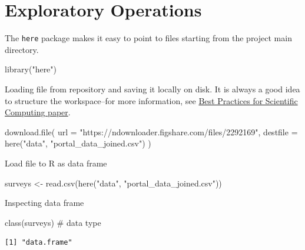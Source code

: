\documentclass[
  letterpaper,
  DIV=11,
  numbers=noendperiod]{scrreprt}
\newenvironment{Shaded}{\begin{snugshade}}{\end{snugshade}}
\newcommand{\AttributeTok}[1]{\textcolor[rgb]{0.40,0.45,0.13}{#1}}
\newcommand{\CommentTok}[1]{\textcolor[rgb]{0.37,0.37,0.37}{#1}}
\newcommand{\FunctionTok}[1]{\textcolor[rgb]{0.28,0.35,0.67}{#1}}
\newcommand{\NormalTok}[1]{\textcolor[rgb]{0.00,0.23,0.31}{#1}}
\newcommand{\OtherTok}[1]{\textcolor[rgb]{0.00,0.23,0.31}{#1}}
\newcommand{\StringTok}[1]{\textcolor[rgb]{0.13,0.47,0.30}{#1}}
\begin{document}
\section{Exploratory Operations}\label{exploratory-operations}

The \texttt{here} package makes it easy to point to files starting from
the project main directory.

\begin{Shaded}
\begin{Highlighting}[]
\FunctionTok{library}\NormalTok{(}\StringTok{"here"}\NormalTok{)}
\end{Highlighting}
\end{Shaded}

Loading file from repository and saving it locally on disk. It is always
a good idea to structure the workspace--for more information, see
\href{http://journals.plos.org/plosbiology/article?id=10.1371/journal.pbio.1001745}{Best
Practices for Scientific Computing paper}.

\begin{Shaded}
\begin{Highlighting}[]
\FunctionTok{download.file}\NormalTok{(}
  \AttributeTok{url =} \StringTok{"https://ndownloader.figshare.com/files/2292169"}\NormalTok{,}
  \AttributeTok{destfile =} \FunctionTok{here}\NormalTok{(}\StringTok{"data"}\NormalTok{, }\StringTok{"portal\_data\_joined.csv"}\NormalTok{)}
\NormalTok{)}
\end{Highlighting}
\end{Shaded}

Load file to R as data frame

\begin{Shaded}
\begin{Highlighting}[]
\NormalTok{surveys }\OtherTok{\textless{}{-}} \FunctionTok{read.csv}\NormalTok{(}\FunctionTok{here}\NormalTok{(}\StringTok{"data"}\NormalTok{, }\StringTok{"portal\_data\_joined.csv"}\NormalTok{))}
\end{Highlighting}
\end{Shaded}

Inspecting data frame

\begin{Shaded}
\begin{Highlighting}[]
\FunctionTok{class}\NormalTok{(surveys) }\CommentTok{\# data type}
\end{Highlighting}
\end{Shaded}

\begin{verbatim}
[1] "data.frame"
\end{verbatim}
\end{document}
